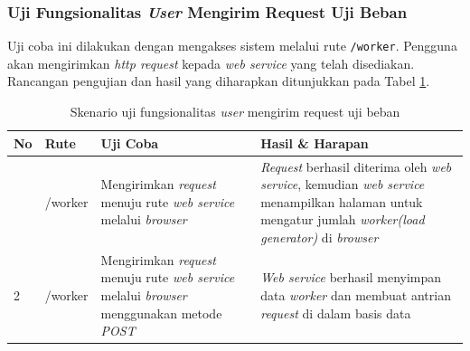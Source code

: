		\subsubsection{Uji Fungsionalitas \textit{User} Mengirim Request Uji Beban}
			Uji coba ini dilakukan dengan mengakses sistem melalui rute \texttt{/worker}. Pengguna akan mengirimkan \textit{http request} kepada \textit{web service} yang telah disediakan. Rancangan pengujian dan hasil yang diharapkan ditunjukkan pada Tabel \ref{tabelujirequest}.
			\begin{longtable}{|p{}|p{}|p{0.30\textwidth}|p{}|}
				\caption{Skenario uji fungsionalitas \textit{user} mengirim request uji beban} \label{tabelujirequest} \\ \hline
				\textbf{No} & \textbf{Rute} & \textbf{Uji Coba} & \textbf{Hasil \& Harapan} \\ \hline
				\endhead
				\endfoot
				\endlastfoot
				1 & /worker & Mengirimkan \textit{request} menuju rute \textit{web service} melalui \textit{browser} & \textit{Request} berhasil diterima oleh \textit{web service}, kemudian \textit{web service} menampilkan halaman untuk mengatur jumlah \textit{worker(load generator)} di \textit{browser} \\ \hline
				2 & /worker & Mengirimkan \textit{request} menuju rute \textit{web service} melalui \textit{browser} menggunakan metode \textit{POST} & \textit{Web service} berhasil menyimpan data \textit{worker} dan membuat antrian \textit{request} di dalam basis data  \\ \hline
			\end{longtable}
		

